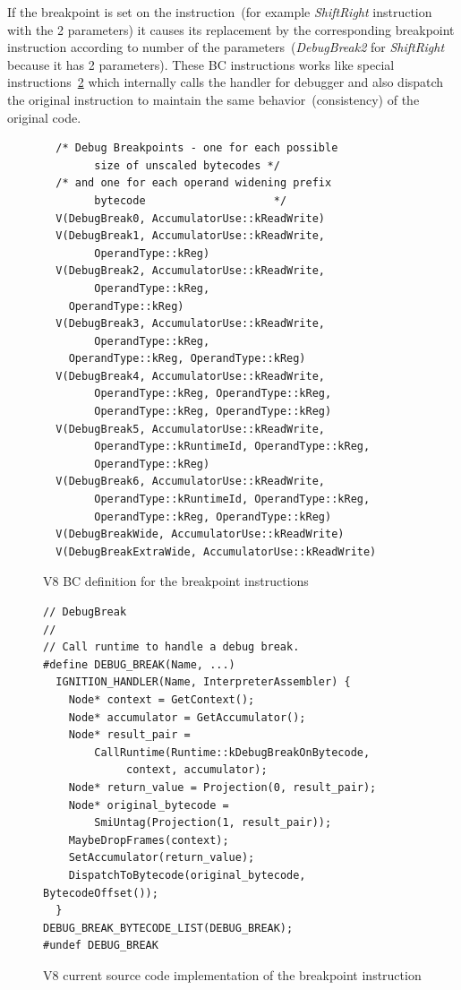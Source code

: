 \documentclass[thesis=M,english]{FITthesis}[2018/10/20]
\begin{document}
If the breakpoint is set on the instruction~(for example \textit{ShiftRight} instruction with the 2 parameters) it causes its replacement by the corresponding breakpoint instruction according to number of the parameters~(\textit{DebugBreak2} for \textit{ShiftRight} because it has 2 parameters). These BC instructions works like special instructions~\ref{fig:v8-breakpoint-instruction-implementation} which internally calls the handler for debugger and also dispatch the original instruction to maintain the same behavior~(consistency) of the original code.

\begin{figure}[!h]
\begin{lstlisting}
  /* Debug Breakpoints - one for each possible
  		size of unscaled bytecodes */
  /* and one for each operand widening prefix
  		bytecode                    */
  V(DebugBreak0, AccumulatorUse::kReadWrite)
  V(DebugBreak1, AccumulatorUse::kReadWrite,
  		OperandType::kReg)
  V(DebugBreak2, AccumulatorUse::kReadWrite,
  		OperandType::kReg,
    OperandType::kReg)
  V(DebugBreak3, AccumulatorUse::kReadWrite,
  		OperandType::kReg,
    OperandType::kReg, OperandType::kReg)
  V(DebugBreak4, AccumulatorUse::kReadWrite,
  		OperandType::kReg, OperandType::kReg,
  		OperandType::kReg, OperandType::kReg)
  V(DebugBreak5, AccumulatorUse::kReadWrite,
  		OperandType::kRuntimeId, OperandType::kReg,
  		OperandType::kReg)
  V(DebugBreak6, AccumulatorUse::kReadWrite,
  		OperandType::kRuntimeId, OperandType::kReg,
  		OperandType::kReg, OperandType::kReg)
  V(DebugBreakWide, AccumulatorUse::kReadWrite)
  V(DebugBreakExtraWide, AccumulatorUse::kReadWrite)
\end{lstlisting}
	\caption{V8 BC definition for the breakpoint instructions}\label{fig:v8-bc-breakpoint-definitions}
\end{figure}

\begin{figure}[!h]
\begin{lstlisting}
// DebugBreak
//
// Call runtime to handle a debug break.
#define DEBUG_BREAK(Name, ...)
  IGNITION_HANDLER(Name, InterpreterAssembler) {
    Node* context = GetContext();
    Node* accumulator = GetAccumulator();
    Node* result_pair =
        CallRuntime(Runtime::kDebugBreakOnBytecode,
        	 context, accumulator);
    Node* return_value = Projection(0, result_pair);
    Node* original_bytecode =
    	SmiUntag(Projection(1, result_pair));
    MaybeDropFrames(context);
    SetAccumulator(return_value);
    DispatchToBytecode(original_bytecode, BytecodeOffset());
  }
DEBUG_BREAK_BYTECODE_LIST(DEBUG_BREAK);
#undef DEBUG_BREAK
\end{lstlisting}
	\caption{V8 current source code implementation of the breakpoint instruction}\label{fig:v8-breakpoint-instruction-implementation}
\end{figure}
\end{document}
